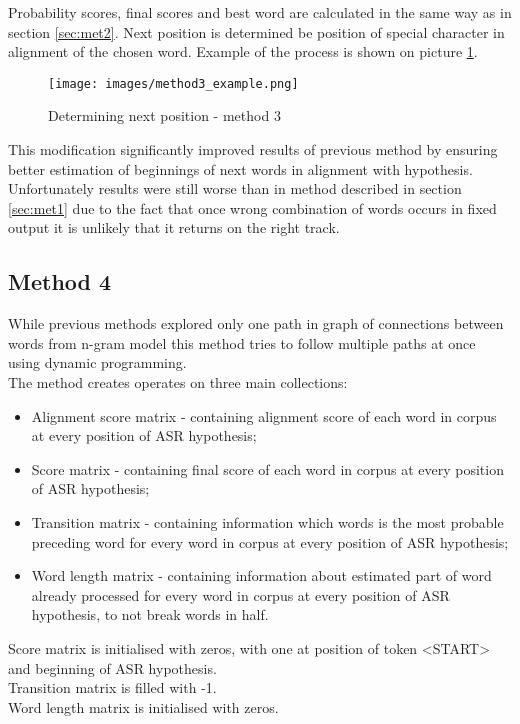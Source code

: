 \documentclass[a4paper,11pt,twoside]{report}
\theoremstyle{definition}
\begin{document}
Probability scores, final scores and best word are calculated in the same way as in section \ref{sec:met2}. Next position is determined be position of special character in alignment of the chosen word. Example of the process is shown on picture \ref{img:method3example}.

\begin{figure}[H]{}
    \centering
    \texttt{[image: images/method3\_example.png]}
    \caption{Determining next position - method 3}
    \label{img:method3example}
\end{figure}

This modification significantly improved results of previous method by ensuring better estimation of beginnings of next words in alignment with hypothesis. Unfortunately results were still worse than in method described in section \ref{sec:met1} due to the fact that once wrong combination of words occurs in fixed output it is unlikely that it returns on the right track. 

\subsection{Method 4}

While previous methods explored only one path in graph of connections between words from n-gram model this method tries to follow multiple paths at once using dynamic programming.\\
The method creates operates on three main collections:
\begin{itemize}
    \item Alignment score matrix - containing alignment score of each word in corpus at every position of ASR hypothesis;
    \item Score matrix - containing final score of each word in corpus at every position of ASR hypothesis;
    \item Transition matrix - containing information which words is the most probable preceding word for every word in corpus at every position of ASR hypothesis;
    \item Word length matrix - containing information about estimated part of word already processed for every word in corpus at every position of ASR hypothesis, to not break words in half.
\end{itemize}

Score matrix is initialised with zeros, with one at position of token <START> and beginning of ASR hypothesis.\\
Transition matrix is filled with -1.\\
Word length matrix is initialised with zeros.\\
\end{document}
